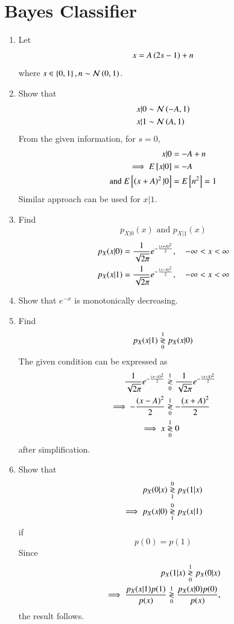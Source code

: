 \documentclass[journal,12pt,twocolumn]{IEEEtran}
\renewcommand\thesection{\arabic{section}}
\begin{document}
\section{Bayes Classifier}
\begin{enumerate}[label=\thesection.\arabic*
,ref=\thesection.\theenumi]
%
\item Let
%
\begin{align}
x = A\left(2s-1\right) + n
\end{align}
%
where $s \in \left\{0,1\right\}, n \sim \mathcal{N}\left(0,1\right)$.

\item Show that
\begin{align}
x|0  &\sim \mathcal{N}\left(-A,1\right)
\\
x|1 &\sim \mathcal{N}\left(A,1\right)
\end{align}
\solution From the given information, for $s=0$,
\begin{align}
x|0  &= -A + n
\\
\implies E\left[ x|0 \right]  &= -A 
\\
\text{and } E\left[ \left(x+A\right)^2|0 \right]  &= E\left[ n^2 \right] = 1 
\end{align}
%
Similar approach can be used for  $x|1$.
\item Find
\begin{equation}
p_{X|0}(x)\text{ and } p_{X|1}(x)
\end{equation}
\solution
\begin{align}
p_{X}(x|0)  &= \frac{1}{\sqrt{2\pi}}e^{-\frac{\left(x+A\right)^2}{2}}, 
\quad 
-\infty < x < \infty
\\
p_{X}(x|1)  &= 
\frac{1}{\sqrt{2\pi}}e^{-\frac{\left(x-A\right)^2}{2}}, \quad 
-\infty < x < \infty
\end{align}
\item Show that $e^{-x}$ is monotonically decreasing.
\item Find
\begin{equation}
p_{X}(x|1) \overset{1}{\underset{0}{\gtrless}} p_{X}(x|0)
\end{equation}
%
\solution The given condition can be expressed as
\begin{align}
 \frac{1}{\sqrt{2\pi}}e^{-\frac{\left(x-A\right)^2}{2}}
&\overset{1}{\underset{0}{\gtrless}}
\frac{1}{\sqrt{2\pi}}e^{-\frac{\left(x+A\right)^2}{2}}
\\
\implies -\frac{\left(x-A\right)^2}{2}
&\overset{1}{\underset{0}{\gtrless}}
-\frac{\left(x+A\right)^2}{2}
\\
\implies x &\overset{1}{\underset{0}{\gtrless}} 0
\label{eq:bayes_dec}
\end{align}
%
after simplification.
\item Show that 
\begin{align}
p_{X}(0|x) \overset{0}{\underset{1}{\gtrless}} p_{X}(1|x)
\\
\implies p_{X}(x|0) \overset{0}{\underset{1}{\gtrless}} p_{X}(x|1)
\end{align}
if
\begin{equation}
p(0)=p(1)
\end{equation}
%
\solution Since 
\begin{align}
p_{X}(1|x) \overset{1}{\underset{0}{\gtrless}} p_{X}(0|x)
\\
\implies \frac{p_{X}(x|1) p(1)}{p(x)}\overset{1}{\underset{0}{\gtrless}} 
\frac{p_{X}(x|0)p(0)}{p(x)},
\end{align}
%
the result follows.
\end{enumerate}
\end{document}

